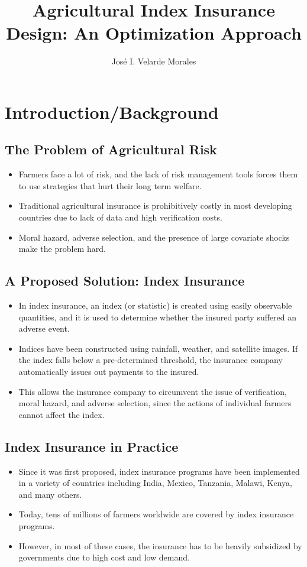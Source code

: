 \documentclass[11pt]{article}
\title{Agricultural Index Insurance Design: An Optimization Approach}
\author{José I. Velarde Morales}
\begin{document}
\maketitle
\section{Introduction/Background}
  \subsection{The Problem of Agricultural Risk}
    \begin{itemize}
        \item Farmers face a lot of risk, and the lack of risk management tools forces them to use strategies that hurt their long term welfare.
        \item Traditional agricultural insurance is prohibitively costly in most developing countries due to lack of data and high verification costs.  
        \item Moral hazard, adverse selection, and the presence of large covariate shocks make the problem hard. 
    \end{itemize}
  \subsection{A Proposed Solution: Index Insurance}
    \begin{itemize}
        \item In index insurance, an index (or statistic) is created using easily observable quantities, and it is used to determine whether the insured party suffered an adverse event.  
        \item Indices have been constructed using rainfall, weather, and satellite images. If the index falls below a pre-determined threshold, the insurance company automatically issues out payments to the insured.
        \item This allows the insurance company to circumvent the issue of verification, moral hazard, and adverse selection, since the actions of individual farmers cannot affect the index.
    \end{itemize}
  \subsection{Index Insurance in Practice}
    \begin{itemize}
        \item Since it was first proposed, index insurance programs have been implemented in a variety of countries including India, Mexico, Tanzania, Malawi, Kenya, and many others. 
        \item Today, tens of millions of farmers worldwide are covered by index insurance programs. 
        \item However, in most of these cases, the insurance has to be heavily subsidized by governments due to high cost and low demand. 
    \end{itemize}
\end{document}
